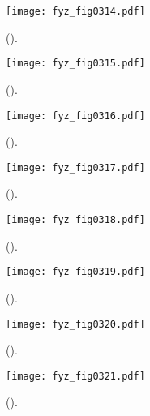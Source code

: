   \begin{figure}[ht!]  %
    \centering
    \texttt{[image: fyz\_fig0314.pdf]}
    \caption{
             (\cite[s.~148]{Feynman02}).}
    \label{fyz:fig0314}
  \end{figure}

  \begin{figure}[ht!]  %
    \centering
    \texttt{[image: fyz\_fig0315.pdf]}
    \caption{
             (\cite[s.~148]{Feynman02}).}
    \label{fyz:fig0315}
  \end{figure}

  \begin{figure}[ht!]  %
    \centering
    \texttt{[image: fyz\_fig0316.pdf]}
    \caption{
             (\cite[s.~148]{Feynman02}).}
    \label{fyz:fig0316}
  \end{figure}
  
  \begin{figure}[ht!]  %
    \centering
    \texttt{[image: fyz\_fig0317.pdf]}
    \caption{
             (\cite[s.~148]{Feynman02}).}
    \label{fyz:fig0317}
  \end{figure}

  \begin{figure}[ht!]  %
    \centering
    \texttt{[image: fyz\_fig0318.pdf]}
    \caption{
             (\cite[s.~148]{Feynman02}).}
    \label{fyz:fig0318}
  \end{figure}

  \begin{figure}[ht!]  %
    \centering
    \texttt{[image: fyz\_fig0319.pdf]}
    \caption{
             (\cite[s.~148]{Feynman02}).}
    \label{fyz:fig0319}
  \end{figure}

  \begin{figure}[ht!]  %
    \centering
    \texttt{[image: fyz\_fig0320.pdf]}
    \caption{
             (\cite[s.~148]{Feynman02}).}
    \label{fyz:fig0320}
  \end{figure}

  \begin{figure}[ht!]  %
    \centering
    \texttt{[image: fyz\_fig0321.pdf]}
    \caption{
             (\cite[s.~148]{Feynman02}).}
    \label{fyz:fig0321}
  \end{figure}

